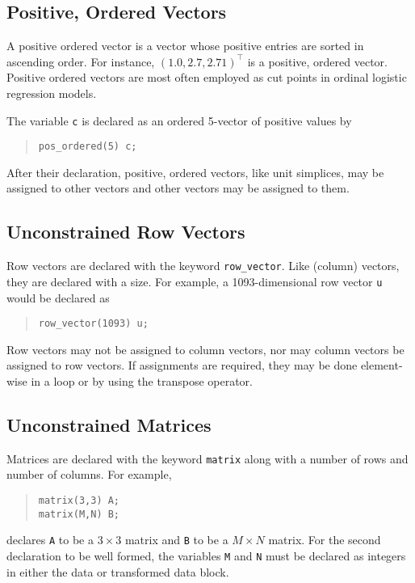 \documentclass[10pt]{report}
\newcommand{\code}[1]{{\tt #1}}
\begin{document}
\subsection{Positive, Ordered Vectors}

A positive ordered vector is a vector whose positive entries are
sorted in ascending order.  For instance, $(1.0,2.7,2.71)^{\top}$ is a
positive, ordered vector.  Positive ordered vectors are most often
employed as cut points in ordinal logistic regression models.  

The variable \code{c} is declared as an ordered 5-vector of positive
values by
%
\begin{quote}
\begin{Verbatim}
pos_ordered(5) c;
\end{Verbatim}
\end{quote}
%

After their declaration, positive, ordered vectors, like unit
simplices, may be assigned to other vectors and other vectors may be
assigned to them.  

\subsection{Unconstrained Row Vectors}

Row vectors are declared with the keyword \code{row\_vector}.
Like (column) vectors, they are declared with a size.  For example,
a 1093-dimensional row vector \code{u} would be declared as
%
\begin{quote}
\begin{Verbatim}
row_vector(1093) u;
\end{Verbatim}
\end{quote}
%

Row vectors may not be assigned to column vectors, nor may column
vectors be assigned to row vectors.  If assignments are required, they
may be done element-wise in a loop or by using the transpose operator.

\subsection{Unconstrained Matrices}

Matrices are declared with the keyword \code{matrix} along with a
number of rows and number of columns.  For example, 
%
\begin{quote}
\begin{Verbatim}  
matrix(3,3) A;  
matrix(M,N) B;
\end{Verbatim}
\end{quote}
%  
declares \code{A} to be a $3 \times 3$ matrix and \code{B} to be a $M
\times N$ matrix.  For the second declaration to be well formed, the
variables \code{M} and \code{N} must be declared as integers in either
the data or transformed data block.
\end{document}
